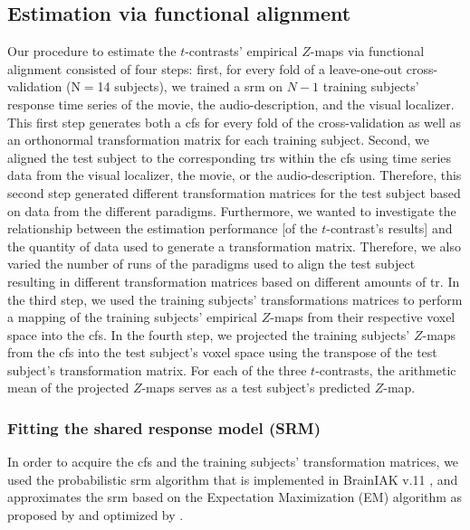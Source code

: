 \subsection{Estimation via functional alignment}
%
Our procedure to estimate the $t$-contrasts' empirical $Z$-maps via functional
alignment consisted of four steps:
first, for every fold of a leave-one-out cross-validation (N$=$14 subjects), we
trained a \ac{srm} on $N-1$ training subjects' response time series of the
movie, the audio-description, and the visual localizer.
This first step generates both a \ac{cfs} for every fold of the cross-validation
as well as an orthonormal transformation matrix for each training subject.
Second, we aligned the test subject to the corresponding \acp{tr} within the
\ac{cfs} using time series data from the visual localizer, the movie, or the
audio-description.
%
Therefore, this second step generated different transformation matrices for the
test subject based on data from the different paradigms.
Furthermore, we wanted to investigate the relationship between the estimation
performance [of the $t$-contrast's results] and the quantity of data used to
generate a transformation matrix.
Therefore, we also varied the number of runs of the paradigms used to align the
test subject resulting in different transformation matrices based on different
amounts of \ac{tr}.
In the third step, we used the training subjects' transformations matrices to
perform a mapping of the training subjects' empirical $Z$-maps from their
respective voxel space into the \ac{cfs}.
In the fourth step, we projected the training subjects' $Z$-maps from the
\ac{cfs} into the test subject's voxel space using the transpose of the test
subject's transformation matrix.
For each of the three $t$-contrasts, the arithmetic mean of the projected
$Z$-maps serves as a test subject's predicted $Z$-map.



\subsubsection{Fitting the shared response model (SRM)}

%
In order to acquire the \ac{cfs} and the training subjects' transformation
matrices, we used the probabilistic \ac{srm} algorithm that is implemented in
BrainIAK v.11 \citep[Brain Imaging Analysis Kit;][]{kumar2020brainiak,
kumar2020brainiaktutorial}, and approximates the \ac{srm} based on the
Expectation Maximization (EM) algorithm as proposed by \citet{chen2015reduced}
and optimized by \citet{anderson2016enabling}.


